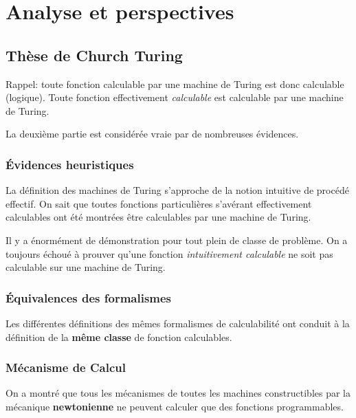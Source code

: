 \documentclass{report}
\begin{document}
\chapter{Analyse et perspectives}
\section{Thèse de Church Turing}
Rappel: toute fonction calculable par une machine de Turing est donc calculable (logique). Toute fonction effectivement \textit{calculable} est calculable par une machine de Turing.\par 
La deuxième partie est considérée vraie par de nombreuses évidences.

\subsection{Évidences heuristiques}
La définition des machines de Turing s'approche de la notion intuitive de procédé effectif. On sait que toutes fonctions particulières s'avérant effectivement calculables ont été montrées être calculables par une machine de Turing.\par 
Il y a énormément de démonstration pour tout plein de classe de problème. On a toujours échoué à prouver qu'une fonction \textit{intuitivement calculable} ne soit pas calculable sur une machine de Turing.

\subsection{Équivalences des formalismes}
Les différentes définitions des mêmes formalismes de calculabilité ont conduit à la définition de la \textbf{même classe} de fonction calculables.

\subsection{Mécanisme de Calcul}
On a montré que tous les mécanismes de toutes les machines constructibles par la mécanique \textbf{newtonienne} ne peuvent calculer que des fonctions programmables.
\end{document}
